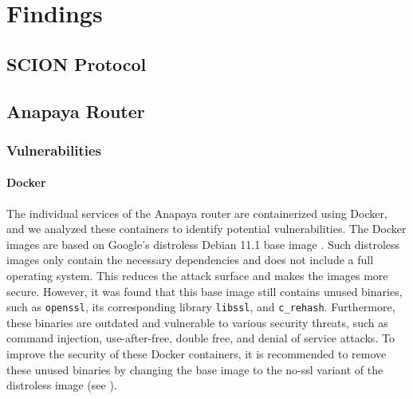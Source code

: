 \chapter{Findings}
\label{ch:findings}



\section{SCION Protocol}






\section{Anapaya Router}



\subsection{Vulnerabilities}

\subsubsection{Docker}

The individual services of the Anapaya router are containerized using Docker, and we analyzed these containers to identify potential vulnerabilities.
The Docker images are based on Google's distroless Debian 11.1 base image \cite{githubGitHubGoogleContainerToolsdistroless}.
Such distroless images only contain the necessary dependencies and does not include a full operating system.
This reduces the attack surface and makes the images more secure.
However, it was found that this base image still contains unused binaries, such as \texttt{openssl}, its corresponding library \texttt{libssl}, and \texttt{c\_rehash}.
Furthermore, these binaries are outdated and vulnerable to various security threats, such as command injection, use-after-free, double free, and denial of service attacks.
To improve the security of these Docker containers, it is recommended to remove these unused binaries by changing the base image to the no-ssl variant of the distroless image (see \cite{githubGitHubGoogleContainerToolsdistroless}).

